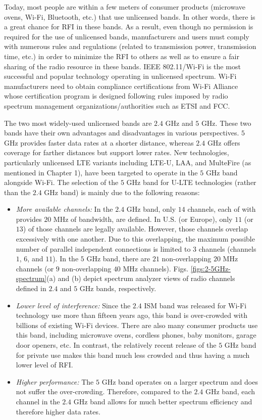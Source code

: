 Today, most people are within a few meters of consumer products (microwave ovens, Wi-Fi, Bluetooth, etc.) that use unlicensed bands. In other words, there is a great chance for RFI in these bands. As a result, even though no permission is required for the use of unlicensed bands, manufacturers and users must comply with numerous rules and regulations (related to transmission power, transmission time, etc.) in order to minimize the RFI to others as well as to ensure a fair sharing of the radio resource in these bands. IEEE 802.11/Wi-Fi is the most successful and popular technology operating in unlicensed spectrum. Wi-Fi manufacturers need to obtain compliance certifications from Wi-Fi Alliance whose certification program is designed following rules imposed by radio spectrum management organizations/authorities such as ETSI and FCC. 

The two most widely-used unlicensed bands are $2.4$ GHz and $5$ GHz. These two bands have their own advantages and disadvantages in various perspectives. $5$ GHz provides faster data rates at a shorter distance, whereas $2.4$ GHz offers coverage for farther distances but support lower rates. New technologies, particularly unlicensed LTE variants including LTE-U, LAA, and MulteFire (as mentioned in Chapter 1), have been targeted to operate in the $5$ GHz band alongside Wi-Fi. The selection of the $5$ GHz band for U-LTE technologies (rather than the $2.4$ GHz band) is mainly due to the following reasons:
\begin{itemize}
\item
\textit{More available channels:} In the $2.4$ GHz band, only $14$ channels, each of with provides $20$ MHz of bandwidth, are defined. In U.S. (or Europe), only $11$ (or $13$) of those channels are legally available. However, those channels overlap excessively with one another. Due to this overlapping, the maximum possible number of parallel independent connections is limited to $3$ channels (channels $1$, $6$, and $11$). In the $5$ GHz band, there are $21$ non-overlapping $20$ MHz channels (or $9$ non-overlapping $40$ MHz channels). Figs. \ref{figs:2-5GHz-spectrum}(a) and (b) depict spectrum analyzer views of radio channels defined in $2.4$ and $5$ GHz bands, respectively.
\item
\textit{Lower level of interference:} Since the $2.4$ ISM band was released for Wi-Fi technology use more than fifteen years ago, this band is over-crowded with billions of existing Wi-Fi devices. There are also many consumer products use this band, including microwave ovens, cordless phones, baby monitors, garage door openers, etc. In contrast, the relatively recent release of the $5$ GHz band for private use makes this band much less crowded and thus having a much lower level of RFI. 
\item
\textit{Higher performance:} The $5$ GHz band operates on a larger spectrum and does not suffer the over-crowding. Therefore, compared to the $2.4$ GHz band, each channel in the $2.4$ GHz band allows for much better spectrum efficiency and therefore higher data rates.
\end{itemize}

